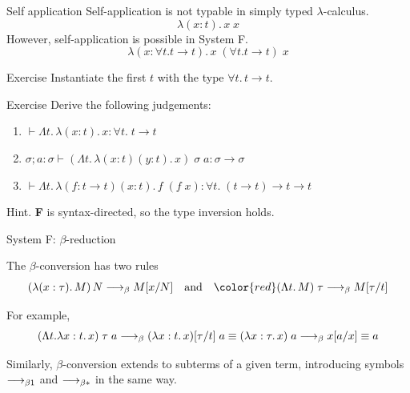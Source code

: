 \begin{frame}{Self application}
Self-application is not typable in simply typed $\lambda$-calculus. 
  \[
    \lambda (x : t).\, x\; x
  \]
  However, self-application is possible in System F. 
  \[
    \lambda (x : \forall t. t\to t).\, x\;(\forall t. t\to t)\;x
  \]
  \begin{block}{Exercise}
    Instantiate the first $t$ with the type $\forall t.\, t \to t$.  
  \end{block}
\end{frame}

\begin{frame}{Exercise}
  Derive the following judgements:
  \begin{enumerate}
    \item ${}\vdash\Lambda t.\,\lambda (x : t).\, x : \forall t.\;t\to t$
    \item $\sigma ; a : \sigma
      \vdash (\Lambda t.\, \lambda (x : t)(y : t).\, x)\;\sigma\;a
      : \sigma \to \sigma$
    \item ${}\vdash\Lambda t.\, \lambda (f : t \to t)(x : t).\, f\;(f\;x) :
      \forall t.\;(t\to t) \to t\to t$
    \end{enumerate}
  Hint. \textbf{F} is syntax-directed, so the type inversion holds. 
  
\end{frame}

\begin{frame}{System F: $\beta$-reduction}
  
The $\beta$-conversion has two rules
\[
  (\lambda (x : \tau).\, M)\,N \longrightarrow_{\beta}
  M\subst{x}{N}
  \quad\text{and}\quad
  \color{red} (\Lambda t.\, M)\;\tau \longrightarrow_{\beta} M \subst{\tau}{t}
\]

For example, 
\[
  (\Lambda t.\lambda x : t.\, x)\; \tau\; a
  \longrightarrow_\beta 
  (\lambda x : t.\, x)[{\tau}/{t}]\;a
  \equiv 
  (\lambda x : \tau.\, x)\;a
  \longrightarrow_\beta 
  x[{a}/{x}]
  \equiv a
\]

Similarly, $\beta$-conversion extends to subterms of a given term, introducing symbols $\longrightarrow_{\beta1}$ and $\longrightarrow_{\beta*}$ in the same way.
\end{frame}

